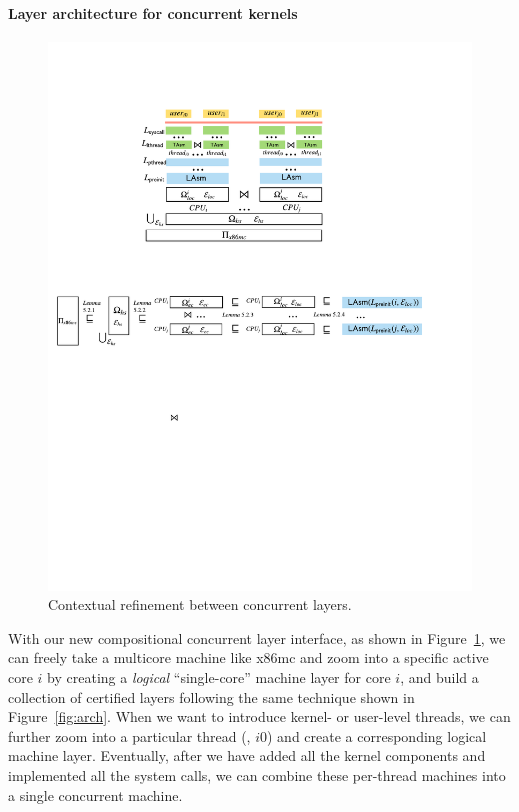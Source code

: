\paragraph{Layer architecture for concurrent kernels}

\begin{figure}[t]\centering
\includegraphics[scale=1]{figs/refine_layer}
\caption{Contextual refinement between concurrent layers.}
\label{fig:spec:refine_layer}
\hrulefill
\end{figure}

With our new compositional concurrent layer interface, as shown in
Figure~\ref{fig:spec:refine_layer}, we can freely take a multicore
machine like x86mc and zoom into a specific active core $i$ by
creating a {\em logical} ``single-core'' machine layer for core $i$,
and build
a collection of certified layers
following the same technique shown in Figure~\ref{fig:arch}. 
When we want to introduce kernel- or
user-level threads, we can further zoom into a particular thread
(\eg, $i0$) and create a corresponding logical machine
layer. Eventually, after we have added all the kernel components and
implemented all the system calls, we can combine these per-thread
machines into a single concurrent machine.


